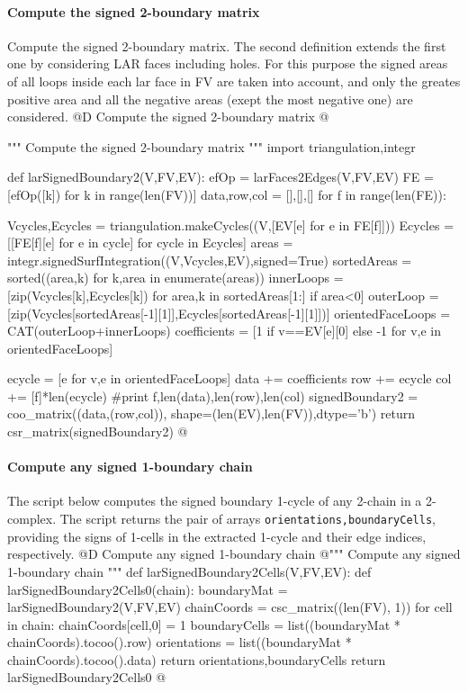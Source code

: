 \documentclass[11pt,oneside]{article}    %
\begin{document}
\paragraph{Compute the signed 2-boundary matrix}
Compute the signed 2-boundary matrix. The second definition extends the first one by considering LAR faces including holes. For this purpose the signed areas of all loops inside each lar face in FV are taken into account, and only the greates positive area and all the negative areas (exept the most negative one) are considered. 
@D Compute the signed 2-boundary matrix
@{""" Compute the signed 2-boundary matrix """
import triangulation,integr
    
def larSignedBoundary2(V,FV,EV):
    efOp = larFaces2Edges(V,FV,EV)
    FE = [efOp([k]) for k in range(len(FV))]
    data,row,col = [],[],[]
    for f in range(len(FE)):
            
        Vcycles,Ecycles = triangulation.makeCycles((V,[EV[e] for e in FE[f]]))
        Ecycles = [[FE[f][e] for e in cycle] for cycle in Ecycles]
        areas = integr.signedSurfIntegration((V,Vcycles,EV),signed=True)
        sortedAreas = sorted((area,k) for k,area in enumerate(areas))
        innerLoops = [zip(Vcycles[k],Ecycles[k]) for area,k in sortedAreas[1:] if area<0]
        outerLoop = [zip(Vcycles[sortedAreas[-1][1]],Ecycles[sortedAreas[-1][1]])]
        orientedFaceLoops = CAT(outerLoop+innerLoops)
        coefficients = [1 if v==EV[e][0] else -1 for v,e in orientedFaceLoops]
		
        ecycle = [e for v,e in orientedFaceLoops]
        data += coefficients
        row += ecycle
        col += [f]*len(ecycle)
        #print f,len(data),len(row),len(col)
    signedBoundary2 = coo_matrix((data,(row,col)), shape=(len(EV),len(FV)),dtype='b')
    return csr_matrix(signedBoundary2)
@}


\paragraph{Compute any signed 1-boundary chain}
The script below computes the signed boundary 1-cycle of any 2-chain in a 2-complex. 
The script returns the pair of arrays \texttt{orientations,boundaryCells}, providing the signs of 1-cells in the extracted 1-cycle and their edge indices, respectively.
@D Compute any signed 1-boundary chain
@{""" Compute any signed 1-boundary chain """
def larSignedBoundary2Cells(V,FV,EV):
	def larSignedBoundary2Cells0(chain):
		boundaryMat = larSignedBoundary2(V,FV,EV)
		chainCoords = csc_matrix((len(FV), 1))
		for cell in chain: chainCoords[cell,0] = 1
		boundaryCells = list((boundaryMat * chainCoords).tocoo().row)
		orientations = list((boundaryMat * chainCoords).tocoo().data)
		return orientations,boundaryCells
	return larSignedBoundary2Cells0
@}
\end{document}

